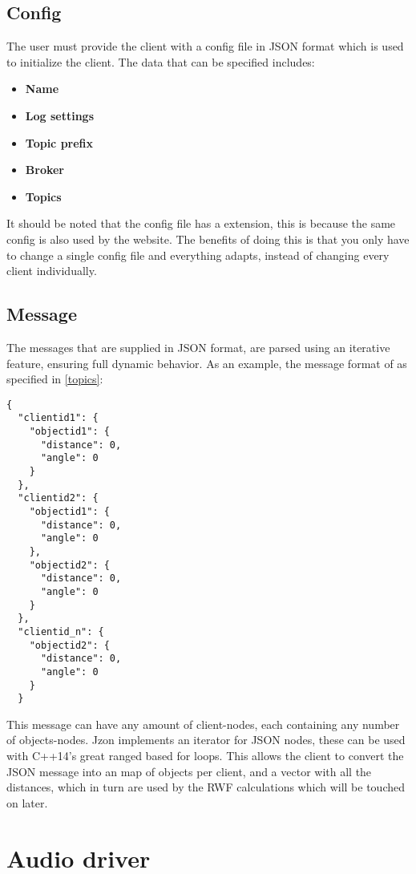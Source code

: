 \subsection{Config}
The user must provide the client with a config file in JSON format which is used to initialize the client. The data that can be specified includes:
\small{
\begin{itemize} [noitemsep, nolistsep]
	\item \textbf {Name}
	\item \textbf {Log settings}
	\item \textbf {Topic prefix}
	\item \textbf {Broker}
	\item \textbf {Topics\\}
\end{itemize}
}
It should be noted that the config file has a  extension, this is because the same config is also used by the website. The benefits of doing this is that you only have to change a single config file and everything adapts, instead of changing every client individually.

\subsection{Message}
The messages that are supplied in JSON format, are parsed using an iterative feature, ensuring full dynamic behavior. As an example, the message format of  as specified in \ref{topics}:
\begin{lstlisting}
{
  "clientid1": {
    "objectid1": {
      "distance": 0,
      "angle": 0
    }
  },
  "clientid2": {
    "objectid1": {
      "distance": 0,
      "angle": 0
    },
    "objectid2": {
      "distance": 0,
      "angle": 0
    }
  },
  "clientid_n": {
    "objectid2": {
      "distance": 0,
      "angle": 0
    }
  }
\end{lstlisting}

This message can have any amount  of client-nodes, each containing any number  of objects-nodes. Jzon implements an iterator for JSON nodes, these can be used with C++14's great ranged based for loops. This allows the client to convert the JSON message into an map of objects per client, and a vector with all the distances, which in turn are used by the RWF calculations which will be touched on later.

\section{Audio driver}
\label{sec:client_audio_driver}

